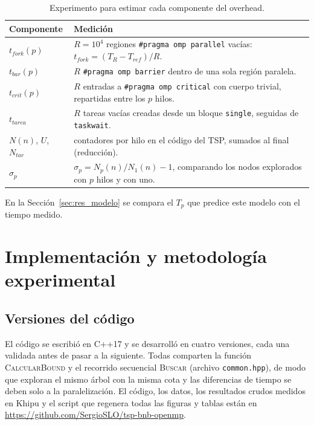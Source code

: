 \documentclass[12pt,a4paper]{article}
\begin{document}
\begin{table}[H]
\centering
\caption{Experimento para estimar cada componente del overhead.}
\label{tab:experimento}
\begin{tabular}{L{0.16\textwidth}L{0.74\textwidth}}
\toprule
\textbf{Componente} & \textbf{Medición} \\
\midrule
$t_{fork}(p)$ & $R=10^4$ regiones \texttt{\#pragma omp parallel} vacías: $t_{fork} = (T_R - T_{ref})/R$. \\
$t_{bar}(p)$ & $R$ \texttt{\#pragma omp barrier} dentro de una sola región paralela. \\
$t_{crit}(p)$ & $R$ entradas a \texttt{\#pragma omp critical} con cuerpo trivial, repartidas entre los $p$ hilos. \\
$t_{tarea}$ & $R$ tareas vacías creadas desde un bloque \texttt{single}, seguidas de \texttt{taskwait}. \\
$N(n)$, $U$, $N_{tar}$ & contadores por hilo en el código del TSP, sumados al final (reducción). \\
$\sigma_p$ & $\sigma_p = N_p(n)/N_1(n) - 1$, comparando los nodos explorados con $p$ hilos y con uno. \\
\bottomrule
\end{tabular}
\end{table}

En la Sección~\ref{sec:res_modelo} se compara el $T_p$ que predice este modelo con el tiempo medido.

\section{Implementación y metodología experimental}
\label{sec:impl}

\subsection{Versiones del código}
El código se escribió en C++17 y se desarrolló en cuatro versiones, cada una validada antes de pasar a la siguiente. Todas comparten la función \textsc{CalcularBound} y el recorrido secuencial \textsc{Buscar} (archivo \texttt{common.hpp}), de modo que exploran el mismo árbol con la misma cota y las diferencias de tiempo se deben solo a la paralelización. El código, los datos, los resultados crudos medidos en Khipu y el script que regenera todas las figuras y tablas están en \url{https://github.com/SergioSLO/tsp-bnb-openmp}.
\end{document}
